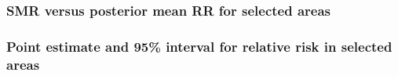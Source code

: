 \documentclass{beamer}
\begin{document}
\begin{frame}
\frametitle{SMR versus posterior mean RR for selected areas}
\vspace{-12mm}
\centerline{}
\end{frame}

\begin{frame}
\frametitle{Point estimate and 95\% interval for relative risk in selected
areas}
\centerline{}
\end{frame}
\end{document}
